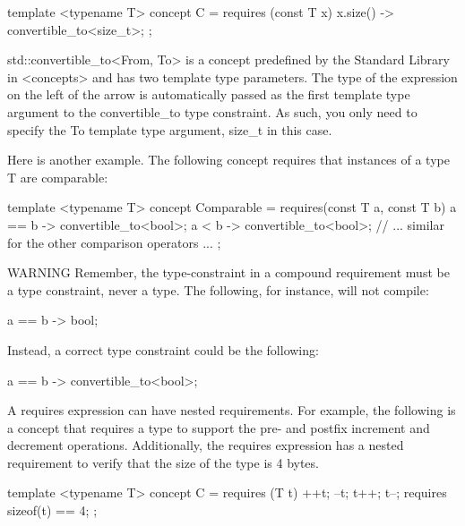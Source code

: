 \begin{cpp}
template <typename T>
concept C = requires (const T x) {
    { x.size() } -> convertible_to<size_t>;
};
\end{cpp}

std::convertible\_to<From, To> is a concept predefined by the Standard Library in <concepts> and has two template type parameters. The type of the expression on the left of the arrow is automatically passed as the first template type argument to the convertible\_to type constraint. As such, you only need to specify the To template type argument, size\_t in this case.

Here is another example. The following concept requires that instances of a type T are comparable:

\begin{cpp}
template <typename T>
concept Comparable = requires(const T a, const T b) {
    { a == b } -> convertible_to<bool>;
    { a < b } -> convertible_to<bool>;
    // ... similar for the other comparison operators ...
};
\end{cpp}

\begin{myWarning}{WARNING}
Remember, the type-constraint in a compound requirement must be a type constraint, never a type. The following, for instance, will not compile:

\begin{cpp}
{ a == b } -> bool;
\end{cpp}

Instead, a correct type constraint could be the following:

\begin{cpp}
{ a == b } -> convertible_to<bool>;
\end{cpp}
\end{myWarning}


A requires expression can have nested requirements. For example, the following is a concept that requires a type to support the pre- and postfix increment and decrement operations. Additionally, the requires expression has a nested requirement to verify that the size of the type is 4 bytes.

\begin{cpp}
template <typename T>
concept C = requires (T t) {
    ++t; --t; t++; t--;
    requires sizeof(t) == 4;
};
\end{cpp}


